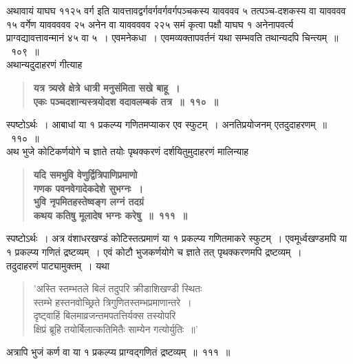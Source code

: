 \documentclass[11pt, openany]{book}
\begin{document}
\newpage

\begin{sloppypar}
\noindent अथावायं याघघ ११२५ वर्ग इति यावत्तावद्वर्गवर्गवर्गवर्गपञ्चकस्य यावववव ५ तत्पञ्च-दशकस्य वा यावववव १५ वर्गेण याववववव २५ अनेन वा याववववव २२५ समं कृत्वा पक्षौ याघघ १ अनेनापवर्त्य प्राग्वद्यावत्तावन्मानं ४५ वा ५~। एवमनेकधा~। एवमव्यक्तापवर्तनं यथा सम्भवति तथान्यदपि चिन्त्यम्~॥~१०९~॥\\

{\small अथान्यदुदाहरणं गीत्याह\textendash }

 \label{7.110}
\begin{quote}
{\large \textbf{{\color{purple}यत्र त्र्यस्रे क्षेत्रे धात्री मनुसंमिता सखे बाहू~।\\
एकः पञ्चदशान्यस्त्रयोदश वदावलम्बकं तत्र~॥~११०~॥}}}
\end{quote}

स्पष्टोऽर्थः~। आबाधां या १ प्रकल्प्य गणितमप्याकर एव स्फुटम्~। अनतिप्रयोजनम् एतदुदाहरणम्~॥~११०~॥\\

{\small अथ भुजे कोटिकर्णयोगे च ज्ञाते तयोः पृथक्करणं दर्शयितुमुदाहरणं मालिन्याह\textendash }

 \label{7.111}
\begin{quote}
{\large \textbf{{\color{purple}यदि समभुवि वेणुर्द्वित्रिपाणिप्रमाणो\\
गणक पवनवेगादेकदेशे सुभग्नः~।\\
भुवि नृपमितहस्तेष्वङ्ग लग्नं तदग्रं\\
कथय कतिषु मूलादेष भग्नः करेषु~॥~१११~॥}}}
\end{quote}

स्पष्टोऽर्थः~। अत्र वंशाधरखण्डं कोटिस्तत्प्रमाणं या १ प्रकल्प्य गणितमाकरे स्फुटम्~। एवमूर्ध्वखण्डमपि या १ प्रकल्प्य गणितं द्रष्टव्यम्~। एवं कोटौ भुजकर्णयोगे च ज्ञाते तत् पृथक्करणमपि द्रष्टव्यम्~।\\

तदुदाहरणं {\color{violet}पाट्या}मुक्तम्~। यथा\textendash

\begin{quote}
{\color{violet}'अस्ति स्तम्भतले बिलं तदुपरि क्रीडाशिखण्डी स्थितः\\
स्तम्भे हस्तनवोच्छ्रिते त्रिगुणितस्तम्भप्रमाणान्तरे~।\\
दृष्ट्वाहिं बिलमाव्रजन्तमपतत्तिर्यक्स तस्योपरि\\
क्षिप्रं ब्रूहि तयोर्बिलात्कतिमितैः साम्येन गत्योर्युतिः~॥'}
\end{quote}

अत्रापि भुजं कर्ण वा या १ प्रकल्प्य प्राग्वद्गणितं द्रष्टव्यम्~॥~१११~॥\\


\end{sloppypar}
\end{document}
